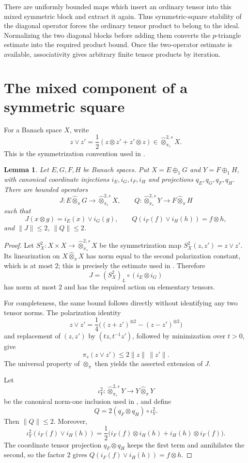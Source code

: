 \documentclass[11pt]{article}
\newtheorem{lemma}{Lemma}
\newcommand{\Sp}[1]{\widehat{\otimes}^{#1,s}_{\pi_s}}
\newcommand{\Tp}{\widehat{\otimes}_{\pi}}
\begin{document}
There are uniformly bounded maps which insert an ordinary tensor into this
mixed symmetric block and extract it again. Thus symmetric-square stability
of the diagonal operator forces the ordinary tensor product to belong to the
ideal. Normalizing the two diagonal blocks before adding them converts the
$p$-triangle estimate into the required product bound. Once the
two-operator estimate is available, associativity gives arbitrary finite
tensor products by iteration.

\section{The mixed component of a symmetric square}

For a Banach space $X$, write
\[
 z\vee z'=\frac12(z\otimes z'+z'\otimes z)\in\Sp{2}X.
\]
This is the symmetrization convention used in \cite[Proposition~7.12]{BT2018}.

\begin{lemma}\label{lem:mixed}
Let $E,G,F,H$ be Banach spaces. Put $X=E\oplus_1G$ and $Y=F\oplus_1H$,
with canonical coordinate injections $i_E,i_G,i_F,i_H$ and projections
$q_E,q_G,q_F,q_H$. There are bounded operators
\[
 J:E\Tp G\longrightarrow\Sp{2}X,
 \qquad
 Q:\Sp{2}Y\longrightarrow F\Tp H
\]
such that
\[
 J(x\otimes g)=i_E(x)\vee i_G(g),\qquad
 Q(i_F(f)\vee i_H(h))=f\otimes h,
\]
and $\|J\|\le2$, $\|Q\|\le2$.
\end{lemma}

\begin{proof}
Let $S_X^2:X\times X\to\Sp{2}X$ be the symmetrization map
$S_X^2(z,z')=z\vee z'$. Its linearization on $X\Tp X$ has norm equal to
the second polarization constant, which is at most $2$; this is precisely
the estimate used in \cite[Proposition~7.12]{BT2018}. Therefore
\[
 J=(S_X^2)_L\circ(i_E\otimes i_G)
\]
has norm at most $2$ and has the required action on elementary tensors.

For completeness, the same bound follows directly without identifying any
two tensor norms. The polarization identity
\[
 z\vee z'=\frac14\bigl((z+z')^{\otimes2}-(z-z')^{\otimes2}\bigr)
\]
and replacement of $(z,z')$ by $(tz,t^{-1}z')$, followed by minimization over
$t>0$, give
\[
             \pi_s(z\vee z')\le2\|z\|\,\|z'\|.
\]
The universal property of $\Tp$ then yields the asserted extension of $J$.

Let
\[
 \iota_Y^2:\Sp{2}Y\longrightarrow Y\Tp Y
\]
be the canonical norm-one inclusion used in
\cite[Proposition~7.12]{BT2018}, and define
\[
                 Q=2(q_F\otimes q_H)\circ\iota_Y^2.
\]
Then $\|Q\|\le2$. Moreover,
\[
 \iota_Y^2(i_F(f)\vee i_H(h))
 =\frac12\bigl(i_F(f)\otimes i_H(h)+i_H(h)\otimes i_F(f)\bigr).
\]
The coordinate tensor projection $q_F\otimes q_H$ keeps the first term and
annihilates the second, so the factor $2$ gives
$Q(i_F(f)\vee i_H(h))=f\otimes h$.
\end{proof}
\end{document}
